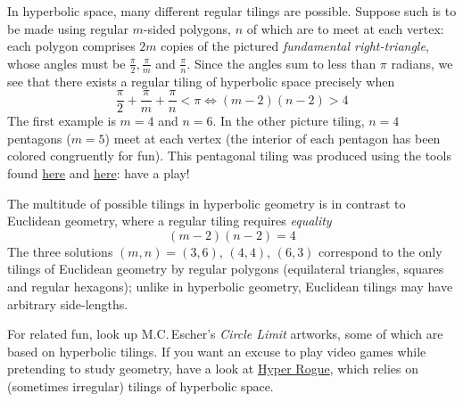 In hyperbolic space, many different regular tilings are possible. Suppose such is to be made using regular $m$-sided polygons, $n$ of which are to meet at each vertex: each polygon comprises $2m$ copies of the pictured \emph{fundamental right-triangle}, whose angles must be $\frac\pi 2, \frac\pi m$ and $\frac\pi n$. Since the angles sum to less than $\pi$ radians, we see that there exists a regular tiling of hyperbolic space precisely when
	\[
		\frac\pi 2+\frac\pi m+\frac\pi n<\pi\iff (m-2)(n-2)>4
	\]
	The first example is $m=4$ and $n=6$. In the other picture tiling, $n=4$ pentagons ($m=5$) meet at each vertex (the interior of each pentagon has been colored congruently for fun). This pentagonal tiling was produced using the tools found
	\href{http://www.malinc.se/noneuclidean/en/poincaretiling.php}{here} and \href{http://www.malinc.se/m/ImageTiling.php}{here}: have a play!\medbreak
	
	The multitude of possible tilings in hyperbolic geometry is in contrast to Euclidean geometry, where a regular tiling requires \emph{equality}
	\[
		(m-2)(n-2)=4
	\]
	The three solutions $(m,n)=(3,6)$, $(4,4)$, $(6,3)$ correspond to the only tilings of Euclidean geometry by regular polygons (equilateral triangles, squares and regular hexagons); unlike in hyperbolic geometry, Euclidean tilings may have arbitrary side-lengths.\medbreak
	
	For related fun, look up M.C.\,Escher's \emph{Circle Limit} artworks, some of which are based on hyperbolic tilings.
	If you want an excuse to play video games while pretending to study geometry, have a look at \href{http://www.roguetemple.com/z/hyper/}{Hyper Rogue}, which relies on (sometimes irregular) tilings of hyperbolic space.





